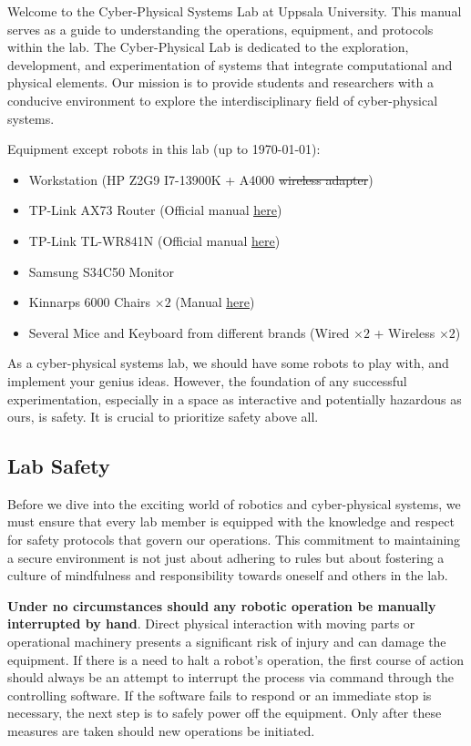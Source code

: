 \documentclass[hidelinks]{article}
\begin{document}
% 
Welcome to the Cyber-Physical Systems Lab at Uppsala University. This manual serves as a guide to understanding the operations, equipment, and protocols within the lab. The Cyber-Physical Lab is dedicated to the exploration, development, and experimentation of systems that integrate computational and physical elements. Our mission is to provide students and researchers with a conducive environment to explore the interdisciplinary field of cyber-physical systems.

Equipment except robots in this lab (up to \today):
\begin{itemize}
    \item Workstation (HP Z2G9 I7-13900K + A4000 \sout{wireless adapter})
    \item TP-Link AX73 Router (Official manual \underline{\href{https://www.tp-link.com/se/support/download/archer-ax73/v2/}{here}})
    \item TP-Link TL-WR841N (Official manual \underline{\href{https://www.tp-link.com/us/user-guides/tl-wr841n_v14/\#ug-sub-title-1}{here}})
    \item Samsung S34C50 Monitor
    \item Kinnarps 6000 Chairs $\times 2$ (Manual \underline{\href{https://www.kinnarps.com/products/seating/task-chairs/60008000/}{here}})
    \item Several Mice and Keyboard from different brands (Wired $\times 2$ + Wireless $\times 2$)
\end{itemize}

As a cyber-physical systems lab, we should have some robots to play with, and implement your genius ideas. However, the foundation of any successful experimentation, especially in a space as interactive and potentially hazardous as ours, is safety. It is crucial to prioritize safety above all.

\subsection*{Lab Safety}
Before we dive into the exciting world of robotics and cyber-physical systems, we must ensure that every lab member is equipped with the knowledge and respect for safety protocols that govern our operations. This commitment to maintaining a secure environment is not just about adhering to rules but about fostering a culture of mindfulness and responsibility towards oneself and others in the lab. 

\textbf{Under no circumstances should any robotic operation be manually interrupted by hand}. Direct physical interaction with moving parts or operational machinery presents a significant risk of injury and can damage the equipment. If there is a need to halt a robot's operation, the first course of action should always be an attempt to interrupt the process via command through the controlling software. If the software fails to respond or an immediate stop is necessary, the next step is to safely power off the equipment. Only after these measures are taken should new operations be initiated.
\end{document}
